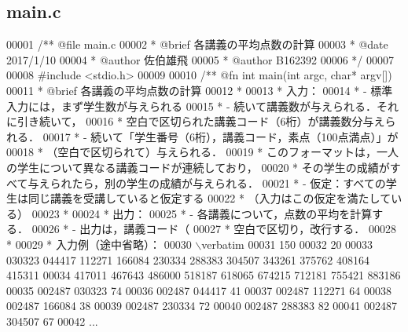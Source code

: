 \subsection{main.\-c}

\begin{DoxyCode}
00001 \textcolor{comment}{/**  @file main.c}
00002 \textcolor{comment}{ *   @brief  各講義の平均点数の計算}
00003 \textcolor{comment}{ *   @date   2017/1/10}
00004 \textcolor{comment}{ *   @author 佐伯雄飛}
00005 \textcolor{comment}{ *   @author B162392}
00006 \textcolor{comment}{ */}
00007 
00008 \textcolor{preprocessor}{#include <stdio.h>}
00009 \textcolor{comment}{}
00010 \textcolor{comment}{/** @fn int main(int argc, char* argv[])}
00011 \textcolor{comment}{ *  @brief 各講義の平均点数の計算}
00012 \textcolor{comment}{ *}
00013 \textcolor{comment}{ *  入力：}
00014 \textcolor{comment}{ *  - 標準入力には，まず学生数が与えられる}
00015 \textcolor{comment}{ *  - 続いて講義数が与えられる．それに引き続いて，}
00016 \textcolor{comment}{ *    空白で区切られた講義コード（6桁）が講義数分与えられる．}
00017 \textcolor{comment}{ *  - 続いて「学生番号（6桁），講義コード，素点（100点満点）」が}
00018 \textcolor{comment}{ *    （空白で区切られて）与えられる．}
00019 \textcolor{comment}{ *    このフォーマットは，一人の学生について異なる講義コードが連続しており，}
00020 \textcolor{comment}{ *    その学生の成績がすべて与えられたら，別の学生の成績が与えられる．}
00021 \textcolor{comment}{ *  - 仮定：すべての学生は同じ講義を受講していると仮定する}
00022 \textcolor{comment}{ *    （入力はこの仮定を満たしている）}
00023 \textcolor{comment}{ *}
00024 \textcolor{comment}{ *  出力：}
00025 \textcolor{comment}{ *  - 各講義について，点数の平均を計算する．}
00026 \textcolor{comment}{ *  - 出力は，講義コード（%
00027 \textcolor{comment}{ *    空白で区切り，改行する．}
00028 \textcolor{comment}{ *}
00029 \textcolor{comment}{ *  入力例（途中省略）：}
00030 \textcolor{comment}{\(\backslash\)verbatim}
00031 \textcolor{comment}{150}
00032 \textcolor{comment}{20}
00033 \textcolor{comment}{030323 044417 112271 166084 230334 288383 304507 343261 375762 408164 415311}
00034 \textcolor{comment}{417011 467643 486000 518187 618065 674215 712181 755421 883186}
00035 \textcolor{comment}{002487 030323 74}
00036 \textcolor{comment}{002487 044417 41}
00037 \textcolor{comment}{002487 112271 64}
00038 \textcolor{comment}{002487 166084 38}
00039 \textcolor{comment}{002487 230334 72}
00040 \textcolor{comment}{002487 288383 82}
00041 \textcolor{comment}{002487 304507 67}
00042 \textcolor{comment}{...}
}
\end{DoxyCode}
